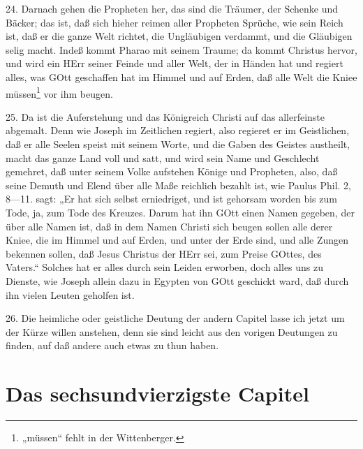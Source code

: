 24. Darnach gehen die Propheten her, das sind die Träumer, der Schenke und Bäcker; das ist, daß sich hieher reimen aller Propheten Sprüche, wie sein Reich ist, daß er die ganze Welt richtet, die Ungläubigen verdammt, und die Gläubigen selig macht. Indeß kommt Pharao
mit seinem Traume; da kommt Christus hervor, und wird ein HErr seiner Feinde und aller Welt, der in Händen hat und regiert alles, was GOtt geschaffen hat im Himmel und auf Erden, daß alle Welt die Kniee müssen\footnote{„müssen“ fehlt in der Wittenberger.} vor ihm beugen.

25. Da ist die Auferstehung und das Königreich Christi auf das allerfeinste abgemalt. Denn wie Joseph im Zeitlichen regiert, also regieret er im Geistlichen, daß er alle Seelen speist mit seinem Worte, und die Gaben des Geistes austheilt, macht das ganze Land voll und satt, und wird sein Name und Geschlecht gemehret, daß unter seinem Volke aufstehen Könige und Propheten, also, daß seine Demuth und Elend über alle Maße reichlich bezahlt ist, wie Paulus Phil. 2, 8—11. sagt: „Er hat sich selbst erniedriget, und ist gehorsam worden bis zum Tode, ja, zum Tode des Kreuzes. Darum hat ihn GOtt einen Namen gegeben, der über alle Namen ist, daß in dem Namen Christi sich beugen sollen alle derer Kniee, die im Himmel und auf Erden, und unter der Erde sind, und alle Zungen bekennen sollen, daß Jesus Christus der HErr sei, zum Preise GOttes, des Vaters.“ Solches hat er alles durch sein Leiden erworben, doch alles uns zu Dienste, wie Joseph allein dazu in Egypten von GOtt geschickt ward, daß durch ihn vielen Leuten geholfen ist.

26. Die heimliche oder geistliche Deutung der andern Capitel lasse ich jetzt um der Kürze willen anstehen, denn sie sind leicht aus den vorigen Deutungen zu finden, auf daß andere auch etwas zu thun haben.

\section{Das sechsundvierzigste Capitel}

